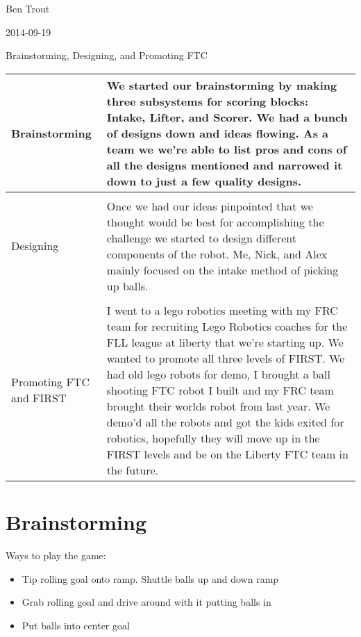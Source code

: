 Ben Trout

2014-09-19

Brainstorming, Designing, and Promoting FTC

\begin{tabular}{|p{5cm}|p{5cm}|}
 \hline
 Brainstorming&
 We started our brainstorming by making three subsystems for scoring blocks:
 Intake, Lifter, and Scorer. We had a bunch of designs down and ideas flowing.
 As a team we we’re able to list pros and cons of all the designs mentioned and narrowed
 it down to just a few quality designs.
 \\
 \hline
 \\
 Designing&
 Once we had our ideas pinpointed that we thought would be best for accomplishing
 the challenge we started to design different components of the robot.
 Me, Nick, and Alex mainly focused on the intake method of picking up balls.
 \\
 \hline
 \\
 Promoting FTC and FIRST&
 I went to a lego robotics meeting with my FRC team for recruiting Lego Robotics coaches
 for the FLL league at liberty that we’re starting up. We wanted to promote all three
 levels of FIRST. We had old lego robots for demo, I brought a ball shooting FTC robot
 I built and my FRC team brought their worlds robot from last year.
 We demo’d all the robots and got the kids exited for robotics, hopefully they will
 move up in the FIRST levels and be on the Liberty FTC team in the future.
 \\
 \hline
\end{tabular}

\section*{Brainstorming}
Ways to play the game:
\begin{itemize}
 \item Tip rolling goal onto ramp. Shuttle balls up and down ramp
 \item Grab rolling goal and drive around with it putting balls in
 \item Put balls into center goal %
\end{itemize}

